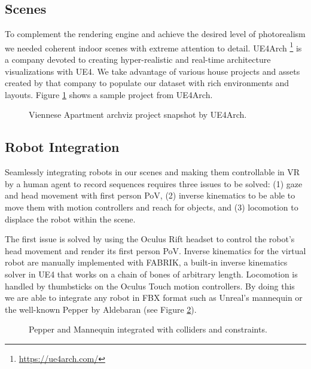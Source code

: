 \subsection{Scenes}

To complement the rendering engine and achieve the desired level of photorealism we needed coherent indoor scenes with extreme attention to detail. UE4Arch \footnote{\url{https://ue4arch.com/}} is a company devoted to creating hyper-realistic and real-time architecture visualizations with \ac{UE4}. We take advantage of various house projects and assets created by that company to populate our dataset with rich environments and layouts. Figure \ref{fig:ue4arch} shows a sample project from UE4Arch.

\begin{figure}[!th]
  \centering
  \caption{Viennese Apartment archviz project snapshot by UE4Arch.}
  \label{fig:ue4arch}
\end{figure}

\subsection{Robot Integration}

Seamlessly integrating robots in our scenes and making them controllable in \ac{VR} by a human agent to record sequences requires three issues to be solved: (1) gaze and head movement with first person \ac{PoV}, (2) inverse kinematics to be able to move them with motion controllers and reach for objects, and (3) locomotion to displace the robot within the scene.

The first issue is solved by using the Oculus Rift headset to control the robot's head movement and render its first person \ac{PoV}. Inverse kinematics for the virtual robot are manually implemented with \ac{FABRIK}, a built-in inverse kinematics solver in \ac{UE4} that works on a chain of bones of arbitrary length. Locomotion is handled by thumbsticks on the Oculus Touch  motion controllers. By doing this we are able to integrate any robot in FBX format such as Unreal's mannequin or the well-known Pepper by Aldebaran (see Figure \ref{fig:robot_integration}).

\begin{figure}[!htb]
  \centering
  \caption{Pepper and Mannequin integrated with colliders and constraints.}
  \label{fig:robot_integration}
\end{figure}

